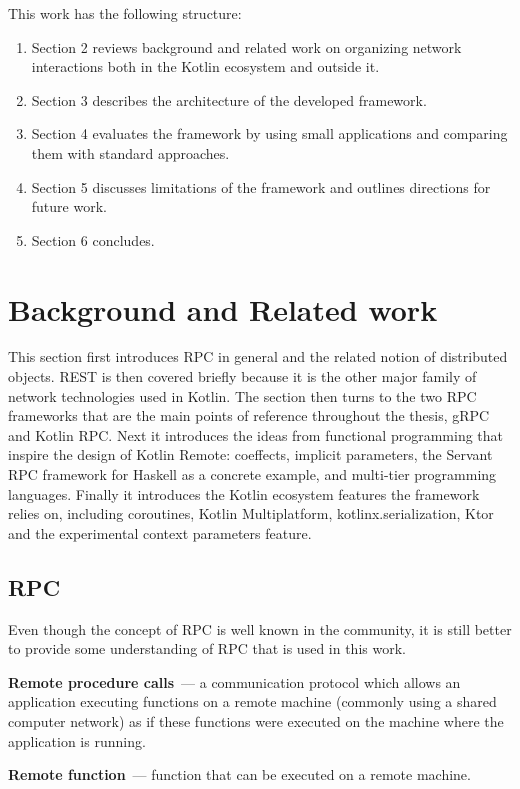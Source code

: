\documentclass[a4paper,11pt,oneside]{article}
\newcommand{\makedefinition}[3][]{\textbf{#2}\ifthenelse{\equal{#1}{}}{}{~(#1)}~--- #3.}
\begin{document}
This work has the following structure:
\begin{enumerate}
  \item Section 2 reviews background and related work on organizing network interactions both in the Kotlin ecosystem and outside it.
  \item Section 3 describes the architecture of the developed framework.
  \item Section 4 evaluates the framework by using small applications and comparing them with standard approaches.
  \item Section 5 discusses limitations of the framework and outlines directions for future work.
  \item Section 6 concludes.
\end{enumerate}

\section{Background and Related work}

This section first introduces RPC in general and the related notion of distributed
objects. REST is then covered briefly because it is the other major family of network
technologies used in Kotlin. The section then turns to the two RPC frameworks that are
the main points of reference throughout the thesis, gRPC and Kotlin RPC. Next it
introduces the ideas from functional programming that inspire the design of Kotlin
Remote: coeffects, implicit parameters, the Servant RPC framework for Haskell as a
concrete example, and multi-tier programming languages. Finally it introduces the
Kotlin ecosystem features the framework relies on, including coroutines, Kotlin
Multiplatform, kotlinx.serialization, Ktor and the experimental context parameters
feature.

\subsection{RPC}

Even though the concept of RPC is well known in the community, it is still better to provide some
understanding of RPC that is used in this work.

\makedefinition[RPC]{Remote procedure calls}{a communication protocol which allows an application
executing functions on a remote machine (commonly using a shared computer network) as if these 
functions were executed on the machine where the application is running}

\makedefinition{Remote function}{function that can be executed on a remote machine}
\end{document}
